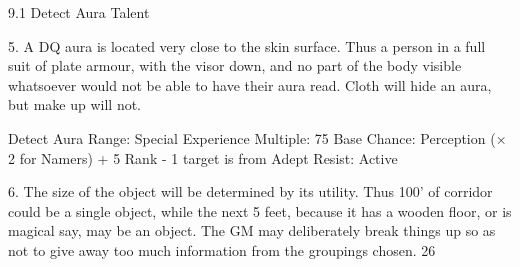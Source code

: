\documentclass[a4paper]{article}
\begin{document}
\begin{multicols}{3}
9.1 Detect Aura Talent

5. A DQ aura is located very close to the skin
surface. Thus a person in a full suit of plate armour, with the visor down, and no part of the body
visible whatsoever would not be able to have their
aura read. Cloth will hide an aura, but make up will
not.

Detect Aura
Range: Special
Experience Multiple: 75
Base Chance: Perception (× 2 for Namers) + 5%
Rank - 1%
target is from Adept
Resist: Active

6. The size of the object will be determined by its
utility. Thus 100’ of corridor could be a single
object, while the next 5 feet, because it has a
wooden floor, or is magical say, may be an object.
The GM may deliberately break things up so as not
to give away too much information from the groupings chosen.
26


\end{multicols}
\end{document}
